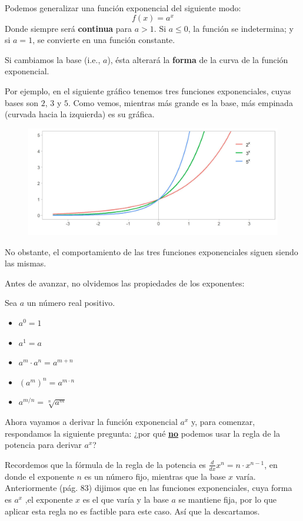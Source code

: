 \documentclass[12pt]{article}
\begin{document}
Podemos generalizar una función exponencial del siguiente modo:
\[f(x) = a^{x}\]
Donde siempre será \textbf{continua} para $a > 1$. Si $a \leq 0$, la función se indetermina; y si $a = 1$, se convierte en una función constante.

Si cambiamos la base (i.e., $a$), ésta alterará la \textbf{forma} de la curva de la función exponencial.

Por ejemplo, en el siguiente gráfico tenemos tres funciones exponenciales, cuyas bases son $2$, $3$ y $5$. Como vemos, mientras más grande es la base, más empinada (curvada hacia la izquierda) es su gráfica.

\begin{figure}[hbt!]
\centering
\includegraphics[scale=0.7]{img/exp_plot_2.jpg}
\end{figure}

No obstante, el comportamiento de las tres funciones exponenciales siguen siendo las mismas.

Antes de avanzar, no olvidemos las propiedades de los exponentes:

Sea $a$ un número real positivo.

\begin{itemize}
\item $a^{0} = 1$
\item $a^{1} = a$
\item $a^{m} \cdot a^{n} = a^{m + n}$
\item $(a^{m})^{n} = a^{m \cdot n}$
\item $a^{m/n} = \sqrt[n]{a^{m}}$
\end{itemize}

Ahora vayamos a derivar la función exponencial $a^{x}$ y, para comenzar, respondamos la siguiente pregunta: ¿por qué \underline{\textbf{no}} podemos usar la regla de la potencia para derivar $a^{x}$?

Recordemos que la fórmula de la regla de la potencia es $\frac{d}{dx} x^{n} = n \cdot x^{n - 1}$, en donde el exponente $n$ es un número fijo, mientras que la base $x$ varía. Anteriormente (pág. 83) dijimos que en las funciones exponenciales, cuya forma es $a^{x}$ ,el exponente $x$ es el que varía y la base $a$ se mantiene fija, por lo que aplicar esta regla no es factible para este caso. Así que la descartamos.
\end{document}
